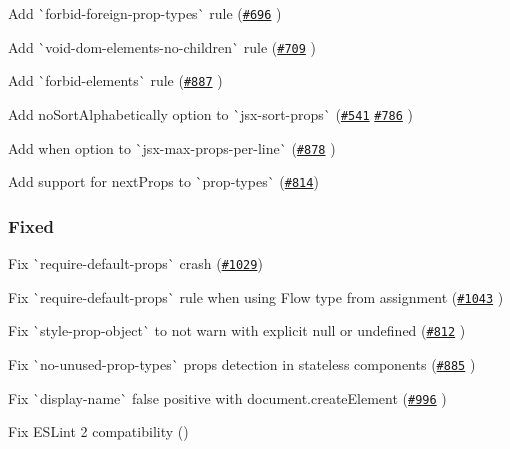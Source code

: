 \begin{DoxyItemize}
\item Add \`{}forbid-\/foreign-\/prop-\/types\`{} rule (\href{https://github.com/yannickcr/eslint-plugin-react/issues/696}{\tt \#696} )
\item Add \`{}void-\/dom-\/elements-\/no-\/children\`{} rule (\href{https://github.com/yannickcr/eslint-plugin-react/issues/709}{\tt \#709} )
\item Add \`{}forbid-\/elements\`{} rule (\href{https://github.com/yannickcr/eslint-plugin-react/issues/887}{\tt \#887} )
\item Add {\ttfamily no\+Sort\+Alphabetically} option to \`{}jsx-\/sort-\/props\`{} (\href{https://github.com/yannickcr/eslint-plugin-react/issues/541}{\tt \#541} \href{https://github.com/yannickcr/eslint-plugin-react/issues/786}{\tt \#786} )
\item Add {\ttfamily when} option to \`{}jsx-\/max-\/props-\/per-\/line\`{} (\href{https://github.com/yannickcr/eslint-plugin-react/issues/878}{\tt \#878} )
\item Add support for {\ttfamily next\+Props} to \`{}prop-\/types\`{} (\href{https://github.com/yannickcr/eslint-plugin-react/issues/814}{\tt \#814})
\end{DoxyItemize}

\subsubsection*{Fixed}


\begin{DoxyItemize}
\item Fix \`{}require-\/default-\/props\`{} crash (\href{https://github.com/yannickcr/eslint-plugin-react/issues/1029}{\tt \#1029})
\item Fix \`{}require-\/default-\/props\`{} rule when using Flow type from assignment (\href{https://github.com/yannickcr/eslint-plugin-react/issues/1043}{\tt \#1043}  )
\item Fix \`{}style-\/prop-\/object\`{} to not warn with explicit {\ttfamily null} or {\ttfamily undefined} (\href{https://github.com/yannickcr/eslint-plugin-react/issues/812}{\tt \#812} )
\item Fix \`{}no-\/unused-\/prop-\/types\`{} props detection in stateless components (\href{https://github.com/yannickcr/eslint-plugin-react/issues/885}{\tt \#885} )
\item Fix \`{}display-\/name\`{} false positive with {\ttfamily document.\+create\+Element} (\href{https://github.com/yannickcr/eslint-plugin-react/issues/996}{\tt \#996} )
\item Fix E\+S\+Lint 2 compatibility ()
\end{DoxyItemize}

